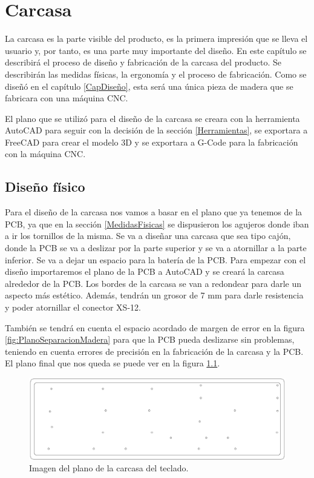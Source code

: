 \chapter{Carcasa}

La carcasa es la parte visible del producto, es la primera impresión que se lleva el usuario y, por tanto, es una parte muy importante del diseño. En este capítulo se describirá el proceso de diseño y fabricación de la carcasa del producto. Se describirán las medidas físicas, la ergonomía y el proceso de fabricación. Como se diseñó en el capítulo \ref{CapDiseño}, esta será una única pieza de madera que se fabricara con una máquina \gls{CNC}.

El plano que se utilizó para el diseño de la carcasa se creara con la herramienta AutoCAD para seguir con la decisión de la sección \ref{Herramientas}, se exportara a FreeCAD para crear el modelo 3D y se exportara a G-Code para la fabricación con la máquina \gls{CNC}.

\section{Diseño físico}
Para el diseño de la carcasa nos vamos a basar en el plano que ya tenemos de la \gls{PCB}, ya que en la sección \ref{MedidasFisicas} se dispusieron los agujeros donde iban a ir los tornillos de la misma. Se va a diseñar una carcasa que sea tipo cajón, donde la \gls{PCB} se va a deslizar por la parte superior y se va a atornillar a la parte inferior. Se va a dejar un espacio para la batería de la \gls{PCB}. Para empezar con el diseño importaremos el plano de la \gls{PCB} a AutoCAD y se creará la carcasa alrededor de la \gls{PCB}. Los bordes de la carcasa se van a redondear para darle un aspecto más estético. Además, tendrán un grosor de 7 mm para darle resistencia y poder atornillar el conector XS-12.

También se tendrá en cuenta el espacio acordado de margen de error en la figura \ref{fig:PlanoSeparacionMadera} para que la \gls{PCB} pueda deslizarse sin problemas, teniendo en cuenta errores de precisión en la fabricación de la carcasa y la \gls{PCB}. El plano final que nos queda se puede ver en la figura \ref{fig:PlanoCarcasa}.

\begin{figure}[H]
    \centering
    \includegraphics[width=1\textwidth]{imagenes/Capitulos/Cap06/PlanoCarcasa.png}
    \caption{Imagen del plano de la carcasa del teclado.}
    \label{fig:PlanoCarcasa}
\end{figure}

